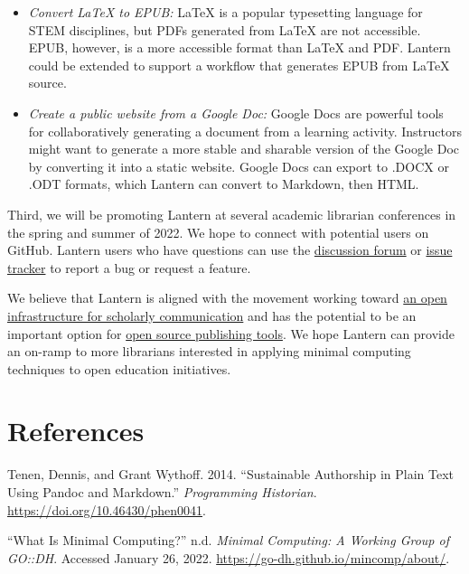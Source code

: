 \documentclass[
  11pt,
  openany]{book}
\newlength{\cslhangindent}
\newlength{\cslentryspacingunit} %
\newenvironment{CSLReferences}[2] %
 {%
  \setlength{\parindent}{0pt}
  \ifodd #1
  \let\oldpar\par
  \def\par{\hangindent=\cslhangindent\oldpar}
  \fi
  \setlength{\parskip}{#2\cslentryspacingunit}
 }%
 {}
\begin{document}
\begin{itemize}
\item
  \emph{Convert LaTeX to EPUB:} LaTeX is a popular typesetting language for
  STEM disciplines, but PDFs generated from LaTeX are not accessible. EPUB,
  however, is a more accessible format than LaTeX and PDF. Lantern could be
  extended to support a workflow that generates EPUB from LaTeX source.
\item
  \emph{Create a public website from a Google Doc:} Google Docs are powerful
  tools for collaboratively generating a document from a learning activity.
  Instructors might want to generate a more stable and sharable version of the
  Google Doc by converting it into a static website. Google Docs can export to
  .DOCX or .ODT formats, which Lantern can convert to Markdown, then HTML.
\end{itemize}

Third, we will be promoting Lantern at several academic librarian conferences
in the spring and summer of 2022. We hope to connect with potential users on
GitHub. Lantern users who have questions can use the
\href{https://github.com/nulib-oer/lantern/discussions}{discussion forum} or
\href{https://github.com/nulib-oer/lantern/issues}{issue tracker} to report a
bug or request a feature.

We believe that Lantern is aligned with the movement working toward
\href{https://investinopen.org/about/}{an open infrastructure for scholarly
communication} and has the potential to be an important option for
\href{https://mindthegap.pubpub.org/}{open source publishing tools}. We hope
Lantern can provide an on-ramp to more librarians interested in applying
minimal computing techniques to open education initiatives.

\hypertarget{references}{%
\section{References}\label{references}}

\hypertarget{refs}{}
\begin{CSLReferences}{1}{0}
\leavevmode{}%
Tenen, Dennis, and Grant Wythoff. 2014. {``Sustainable {Authorship} in {Plain}
{Text} Using {Pandoc} and {Markdown}.''} \emph{Programming Historian}.
\url{https://doi.org/10.46430/phen0041}.

\leavevmode{}%
{``What Is {Minimal} {Computing}?''} n.d. \emph{Minimal Computing: A Working
Group of GO::DH}. Accessed January 26, 2022.
\url{https://go-dh.github.io/mincomp/about/}.

\end{CSLReferences}
\end{document}
